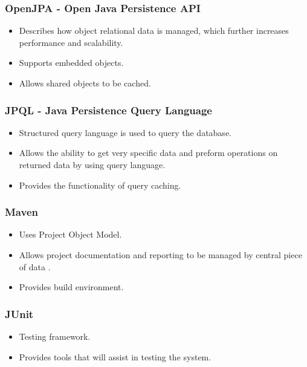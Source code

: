 \documentclass[12pt, oneside]{article}
\begin{document}
		\subsubsection{OpenJPA - Open Java Persistence API}
			\begin{itemize}
				\item Describes how object relational data is managed, which further increases performance and scalability.
				\item Supports embedded objects.
				\item Allows shared objects to be cached.
			\end{itemize}
			
		\subsubsection{JPQL - Java Persistence Query Language}
			\begin{itemize}
				\item Structured query language is used to query the database.
				\item Allows the ability to get very specific data and preform operations on returned data by using query language.
				\item Provides the functionality of query caching.
			\end{itemize}						
		
		\subsubsection{Maven}
			\begin{itemize}
				 \item Uses Project Object Model.
				 \item Allows project documentation and reporting to be managed by central piece of data .
				 \item Provides build environment.
			\end{itemize}
			\subsubsection{JUnit}
			\begin{itemize}
				 \item Testing framework.
				 \item Provides tools that will assist in testing the system.
			\end{itemize}
\end{document}
